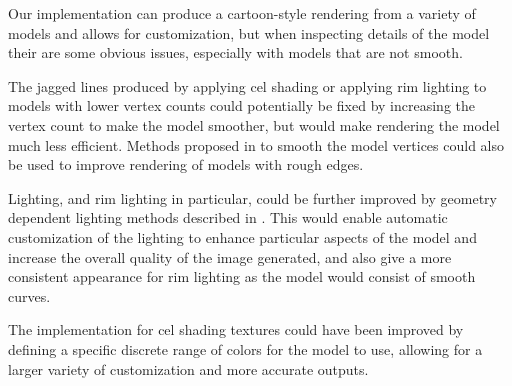 Our implementation can produce a cartoon-style rendering from a variety of models and allows for customization, but when inspecting details of the model their are some obvious issues, especially with models that are not smooth.

The jagged lines produced by applying cel shading or applying rim lighting to models with lower vertex counts could potentially be fixed by increasing the vertex count to make the model smoother, but would make rendering the model much less efficient. Methods proposed in  \cite{riyad16} to smooth the model vertices could also be used to improve rendering of models with rough edges. 

Lighting, and rim lighting in particular, could be further improved by geometry dependent lighting methods described in \cite{lee06}. This would enable automatic customization of the lighting to enhance particular aspects of the model and increase the overall quality of the image generated, and also give a more consistent appearance for rim lighting as the model would consist of smooth curves.

The implementation for cel shading textures could have been improved by defining a specific discrete range of colors for the model to use, allowing for a larger variety of customization and more accurate outputs.